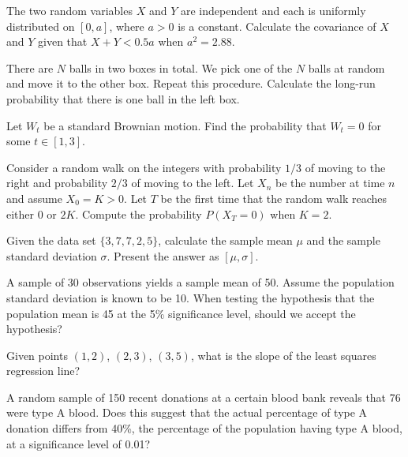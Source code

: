 \begin{problem}    The two random variables $X$ and $Y$ are independent and each is uniformly distributed on $[0, a]$, where $a>0$ is a constant. Calculate the covariance of $X$ and $Y$ given that $X+Y<0.5a$ when $a^2 = 2.88$.
\end{problem}

\begin{problem}   There are $N$ balls in two boxes in total. We pick one of the $N$ balls at random and move it to the other
  box. Repeat this procedure. Calculate the long-run probability that there is one ball in the left box.
\end{problem}

\begin{problem}    Let $W_t$ be a standard Brownian motion. Find the probability that $W_t = 0$ for some $t \in [1, 3]$.
\end{problem}

\begin{problem}    Consider a random walk on the integers with probability $1/3$ of moving to the right and probability $2/3$
   of moving to the left. Let $X_n$ be the number at time $n$ and assume $X_0 = K > 0$. Let $T$ be the first time
   that the random walk reaches either 0 or $2K$. Compute the probability $P(X_T = 0)$ when $K=2$. 
\end{problem}

\newpage


	

	

\begin{problem} Given the data set $ \{3, 7, 7, 2, 5\} $, calculate the sample mean $\mu$ and the sample standard deviation $\sigma$. Present the answer as $[\mu,\sigma]$. 
	\end{problem}

\begin{problem} A sample of 30 observations yields a sample mean of 50. Assume the population standard deviation is known to be 10. When testing the hypothesis that the population mean is 45 at the 5\% significance level, should we accept the hypothesis? 
	\end{problem}

\begin{problem} Given points $ (1, 2) $, $ (2, 3) $, $ (3, 5) $, what is the slope of the least squares regression line?
	\end{problem}

\begin{problem} A random sample of 150 recent donations at a certain blood bank reveals that 76 were type A blood. Does this suggest that the actual percentage of type A donation differs from 40\%, the percentage of the population having type A blood, at a significance level of 0.01?
	\end{problem}

